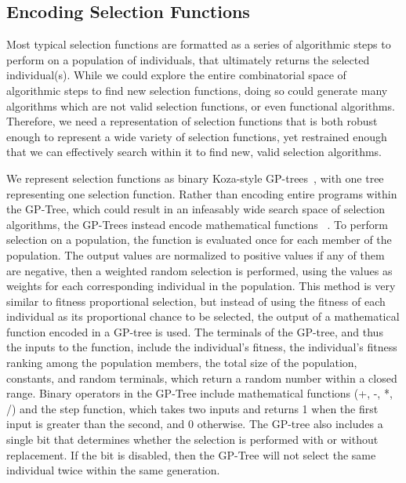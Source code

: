\documentclass[sigconf]{acmart}
\begin{document}
\subsection{Encoding Selection Functions}
\label{Methodology-Encoding Selection Functions}

Most typical selection functions are formatted as a series of algorithmic steps to perform on a population of individuals, that ultimately returns the selected individual(s). While we could explore the entire combinatorial space of algorithmic steps to find new selection functions, doing so could generate many algorithms which are not valid selection functions, or even functional algorithms. Therefore, we need a representation of selection functions that is both robust enough to represent a wide variety of selection functions, yet restrained enough that we can effectively search within it to find new, valid selection algorithms.

We represent selection functions as binary Koza-style GP-trees~\cite{koza1994genetic}, with one tree representing one selection function. Rather than encoding entire programs within the GP-Tree, which could result in an infeasably wide search space of selection algorithms, the GP-Trees instead encode mathematical functions ~\cite{woodward2009GPNotGood}. To perform selection on a population, the function is evaluated once for each member of the population. The output values are normalized to positive values if any of them are negative, then a weighted random selection is performed, using the values as weights for each corresponding individual in the population. This method is very similar to fitness proportional selection, but instead of using the fitness of each individual as its proportional chance to be selected, the output of a mathematical function encoded in a GP-tree is used. The terminals of the GP-tree, and thus the inputs to the function, include the individual's fitness, the individual's fitness ranking among the population members, the total size of the population, constants, and random terminals, which return a random number within a closed range. Binary operators in the GP-Tree include mathematical functions (+, -, *, /) and the step function, which takes two inputs and returns 1 when the first input is greater than the second, and 0 otherwise. The GP-tree also includes a single bit that determines whether the selection is performed with or without replacement. If the bit is disabled, then the GP-Tree will not select the same individual twice within the same generation.
\end{document}
